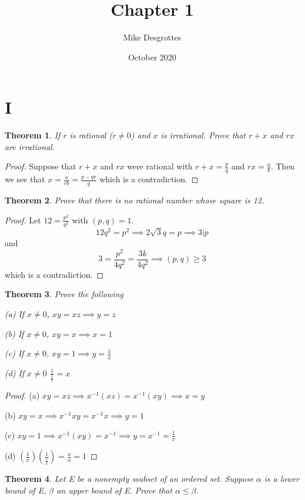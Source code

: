 \documentclass{article}
\title{Chapter 1}
\author{Mike Desgrottes}
\date{October 2020}
\theoremstyle{plain}
\newtheorem{theorem}{Theorem}
\theoremstyle{definition}
\begin{document}
\maketitle

\section{I}

\begin{theorem}
	If $r$ is rational ($r \not = 0$) and $x$ is irrational. Prove that $r + x$ and $rx$ are irrational.
\end{theorem}

\begin{proof}
	Suppose that $r + x$ and $rx$ were rational with $r + x = \frac{p}{q}$ and $rx = \frac{a}{b}$. Then we see that $x = \frac{a}{rb} = \frac{p - qr}{q}$ which is a contradiction.
\end{proof}

\begin{theorem}
	Prove that there is no rational number whose square is 12.
\end{theorem}
\begin{proof}
	Let $12 = \frac{p^{2}}{q^{2}}$ with $(p,q) = 1$. $$12q^{2} = p^{2} \implies 2\sqrt{3}q = p \implies 3 | p $$ and $$3 = \frac{p^{2}}{4q^{2}} = \frac{3k}{4q^{2}} \implies (p,q) \geq  3 $$ which is a contradiction.
\end{proof}

\begin{theorem}
	Prove the following

	(a) If $x \not = 0$, $xy = xz \implies y = z$

	(b) If $x \not = 0$, $xy = x \implies x = 1$

	(c) If $x \not = 0$, $xy = 1 \implies y = \frac{1}{x}$

	(d) If $x \not = 0$ $\frac{1}{\frac{1}{x}} = x$
\end{theorem}

\begin{proof}
	(a) $xy = xz \implies x^{-1}(xz) = x^{-1}(xy) \implies x = y$

	(b) $xy = x \implies x^{-1}xy = x^{-1}x \implies y = 1$

	(c) $xy = 1 \implies x^{-1}(xy) = x^{-1} \implies y = x^{-1} = \frac{1}{x}$

	(d) $(\frac{1}{x})(\frac{1}{\frac{1}{x}}) = \frac{x}{x} = 1$
\end{proof}

\begin{theorem}
	Let E be a nonempty ssubset of an ordered set. Suppose $\alpha$ is a lower bound of E, $\beta$ an upper bound of E. Prove that $\alpha \leq \beta$.
\end{theorem}
\end{document}
